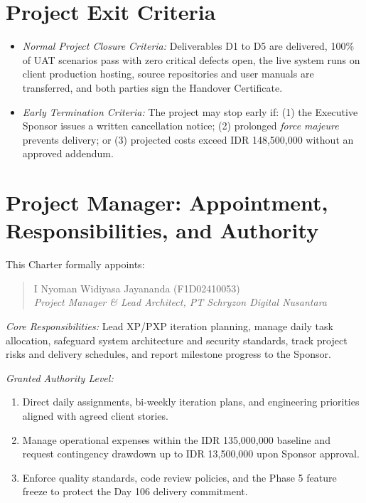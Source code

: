 \documentclass[11pt,a4paper]{article}
\begin{document}
\clearpage
\section{Project Exit Criteria}

\begin{itemize}[leftmargin=1.5em, itemsep=1.5pt, topsep=2pt]
    \item \textit{Normal Project Closure Criteria:} Deliverables D1 to D5 are delivered, 100\% of UAT scenarios pass with zero critical defects open, the live system runs on client production hosting, source repositories and user manuals are transferred, and both parties sign the Handover Certificate.
    \item \textit{Early Termination Criteria:} The project may stop early if: (1) the Executive Sponsor issues a written cancellation notice; (2) prolonged \textit{force majeure} prevents delivery; or (3) projected costs exceed IDR 148,500,000 without an approved addendum.
\end{itemize}

\vspace{-4pt}
\section{Project Manager: Appointment, Responsibilities, and Authority}

This Charter formally appoints:
\begin{quote}\centering\vspace{-4pt}
    I Nyoman Widiyasa Jayananda (F1D02410053) \\
    \textit{Project Manager \& Lead Architect, PT Schryzon Digital Nusantara}
\end{quote}\vspace{-4pt}

\textit{Core Responsibilities:} Lead XP/PXP iteration planning, manage daily task allocation, safeguard system architecture and security standards, track project risks and delivery schedules, and report milestone progress to the Sponsor.

\textit{Granted Authority Level:}
\begin{enumerate}[leftmargin=1.5em, itemsep=1pt, topsep=2pt]
    \item Direct daily assignments, bi-weekly iteration plans, and engineering priorities aligned with agreed client stories.
    \item Manage operational expenses within the IDR 135,000,000 baseline and request contingency drawdown up to IDR 13,500,000 upon Sponsor approval.
    \item Enforce quality standards, code review policies, and the Phase 5 feature freeze to protect the Day 106 delivery commitment.
\end{enumerate}
\end{document}
